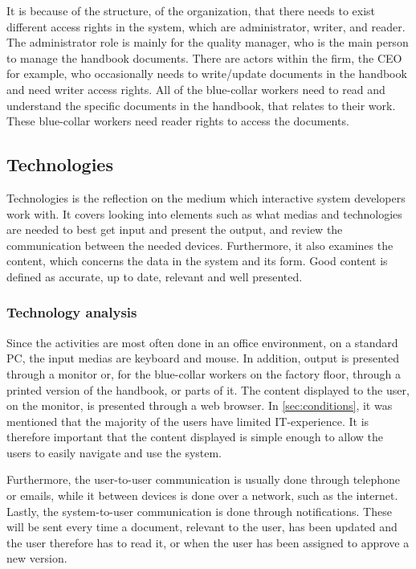 It is because of the structure, of the organization, that there needs to exist different access rights in the system, which are administrator, writer, and reader.
The administrator role is mainly for the quality manager, who is the main person to manage the handbook documents.
There are actors within the firm, the CEO for example, who occasionally needs to write/update documents in the handbook and need writer access rights.
All of the blue-collar workers need to read and understand the specific documents in the handbook, that relates to their work.
These blue-collar workers need reader rights to access the documents.

\subsection{Technologies}
Technologies is the reflection on the medium which interactive system developers work with.
It covers looking into elements such as what medias and technologies are needed to best get input and present the output, and review the communication between the needed devices.
Furthermore, it also examines the content, which concerns the data in the system and its form.
Good content is defined as accurate, up to date, relevant and well presented.

\subsubsection*{Technology analysis}
Since the activities are most often done in an office environment, on a standard PC, the input medias are keyboard and mouse.
In addition, output is presented through a monitor or, for the blue-collar workers on the factory floor, through a printed version of the handbook, or parts of it.
The content displayed to the user, on the monitor, is presented through a web browser.
In \cref{sec:conditions}, it was mentioned that the majority of the users have limited IT-experience.
It is therefore important that the content displayed is simple enough to allow the users to easily navigate and use the system.

Furthermore, the user-to-user communication is usually done through telephone or emails, while it between devices is done over a network, such as the internet.
Lastly, the system-to-user communication is done through notifications.
These will be sent every time a document, relevant to the user, has been updated and the user therefore has to read it, or when the user has been assigned to approve a new version.

